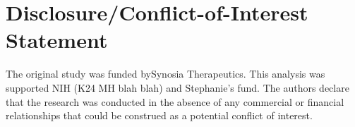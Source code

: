 \section*{Disclosure/Conflict-of-Interest Statement}
The original study was funded bySynosia Therapeutics. This analysis was supported NIH (K24 MH blah blah) and Stephanie's fund.
The authors declare that the research was conducted in the absence of any commercial or financial relationships that could be construed as a potential conflict of interest.